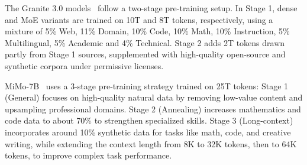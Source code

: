 The Granite 3.0 models~\cite{granite2024granite} follow a two-stage pre-training setup. In Stage 1, dense and MoE variants are trained on 10T and 8T tokens, respectively, using a mixture of 5\% Web, 11\% Domain, 10\% Code, 10\% Math, 10\% Instruction, 5\% Multilingual, 5\% Academic and 4\% Technical. Stage 2 adds 2T tokens drawn partly from Stage 1 sources, supplemented with high-quality open-source and synthetic corpora under permissive licenses.

MiMo-7B~\cite{xiaomi2025mimo} uses a 3-stage pre-training strategy trained on 25T tokens: Stage 1 (General) focuses on high-quality natural data by removing low-value content and upsampling professional domains. Stage 2 (Annealing) increases mathematics and code data to about 70\% to strengthen specialized skills. Stage 3 (Long-context) incorporates around 10\% synthetic data for tasks like math, code, and creative writing, while extending the context length from 8K to 32K tokens, then to 64K tokens, to improve complex task performance.


